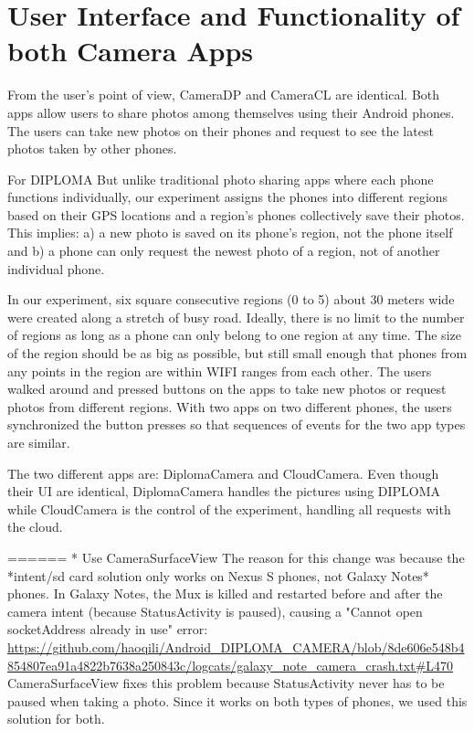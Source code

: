 \chapter{User Interface and Functionality of both Camera Apps}

From the user's point of view, CameraDP and CameraCL are identical. Both apps allow users to share photos among themselves using their Android phones.  The users can take new photos on their phones and request to see the latest photos taken by other phones. 

For DIPLOMA But unlike traditional photo sharing apps where each phone functions individually, our experiment assigns the phones into different regions based on their GPS locations and a region’s phones collectively save their photos.  This implies: a) a new photo is saved on its phone’s region, not the phone itself and b) a phone can only request the newest photo of a region, not of another individual phone. 
 
In our experiment, six square consecutive regions (0 to 5) about 30 meters wide were created along a stretch of busy road.  Ideally, there is no limit to the number of regions as long as a phone can only belong to one region at any time. The size of the region should be as big as possible, but still small enough that phones from any points in the region are within WIFI ranges from each other. The users walked around and pressed buttons on the apps to take new photos or request photos from different regions. With two apps on two different phones, the users synchronized the button presses so that sequences of events for the two app types are similar.

The two different apps are: DiplomaCamera and CloudCamera. Even though their UI are identical, DiplomaCamera handles the pictures using DIPLOMA while CloudCamera is the control of the experiment, handling all requests with the cloud.

======
* Use CameraSurfaceView
   The reason for this change was because the *intent/sd card solution only works on Nexus S phones, not Galaxy Notes* phones. In Galaxy Notes, the Mux is killed and restarted before and after the camera intent (because StatusActivity is paused), causing a "Cannot open socketAddress already in use" error: {\url{https://github.com/haoqili/Android_DIPLOMA_CAMERA/blob/8de606e548b4854807ea91a4822b7638a250843c/logcats/galaxy_note_camera_crash.txt#L470}}
    CameraSurfaceView fixes this problem because StatusActivity never has to be paused when taking a photo. Since it works on both types of phones, we used this solution for both.

